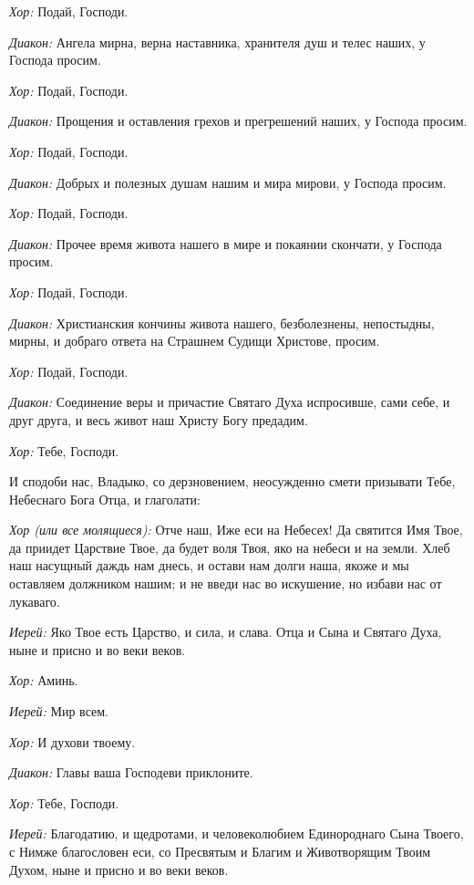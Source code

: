 \begin{mymulticols}
{\itshape Хор:} Подай, Господи.

{\itshape Диакон:} Ангела мирна, верна наставника, хранителя душ и телес наших, у Господа просим. 

{\itshape Хор:} Подай, Господи.

{\itshape Диакон:} Прощения и оставления грехов и прегрешений наших, у Господа просим. 

{\itshape Хор:} Подай, Господи.

{\itshape Диакон:} Добрых и полезных душам нашим и мира мирови, у Господа просим. 

{\itshape Хор:} Подай, Господи.

{\itshape Диакон:} Прочее время живота нашего в мире и покаянии скончати, у Господа просим. 

{\itshape Хор:} Подай, Господи.

{\itshape Диакон:} Христианския кончины живота нашего, безболезнены, непостыдны, мирны, и добраго ответа на Страшнем Судищи Христове, просим. 

{\itshape Хор:} Подай, Господи.

{\itshape Диакон:} Соединение веры и причастие Святаго Духа испросивше, сами себе, и друг друга, и весь живот наш Христу Богу предадим. 

{\itshape Хор:} Тебе, Господи. 

И сподоби нас, Владыко, со дерзновением, неосужденно смети призывати Тебе, Небеснаго Бога Отца, и глаголати: 


{\itshape Хор (или все молящиеся):} Отче наш, Иже еси на Небесех! Да святится Имя Твое, да приидет Царствие Твое, да будет воля Твоя, яко на небеси и на земли. Хлеб наш насущный даждь нам днесь, и остави нам долги наша, якоже и мы оставляем должником нашим; и не введи нас во искушение, но избави нас от лукаваго. 

{\itshape Иерей:} Яко Твое есть Царство, и сила, и слава. Отца и Сына и Святаго Духа, ныне и присно и во веки веков. 

{\itshape Хор:} Аминь. 

{\itshape Иерей:} Мир всем. 

{\itshape Хор:} И духови твоему.

{\itshape Диакон:} Главы ваша Господеви приклоните.

{\itshape Хор:} Тебе, Господи.

{\itshape Иерей:} Благодатию, и щедротами, и человеколюбием Единороднаго Сына Твоего, с Нимже благословен еси, со Пресвятым и Благим и Животворящим Твоим Духом, ныне и присно и во веки веков. 


\end{mymulticols}
